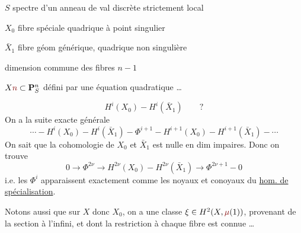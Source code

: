 $S$ spectre d'un anneau de val discrète strictement local

$X_0$ fibre spéciale quadrique à point singulier

$\bar X_1$ fibre géom générique, quadrique non singulière

dimension commune des fibres $n-1$

\unsure{\big[}
$X\deleted{\unsure{n}}\subset\mathbf P^n_S$ défini par une équation quadratique \ldots

\[
H^i(X_0)\mathbin{-}H^i(\bar X_1)\qquad ?
\]
On a la suite exacte générale
\[
\cdots\mathbin{-}H^i(X_0)\mathbin{-}H^i(\bar X_1)
\mathbin{-}\Phi^{i+1}\mathbin{-}H^{i+1}(X_0)
\mathbin{-}H^{i+1}(\bar X_1)\mathbin{-}\cdots
\]
On sait que la cohomologie de 
$X_0$ et $\bar X_1$ est nulle en dim impaires. Donc
on trouve
\[
0\longrightarrow\Phi^{2\nu}\longrightarrow H^{2\nu}(X_0)
\mathbin{-}H^{2\nu}(\bar X_1)\longrightarrow\Phi^{2\nu+1}\mathbin{-}0
\]
i.e. les $\Phi^i$ apparaissent exactement comme les
noyaux et conoyaux du \uline{hom. de spécialisation}.

Notons aussi que sur $X$ donc $X_0$, on a une
classe $\xi\in H^2(X,\unsure{\mu}(1))$, provenant de la section
à l'infini, et dont la restriction à chaque fibre
est connue \ldots
{}

